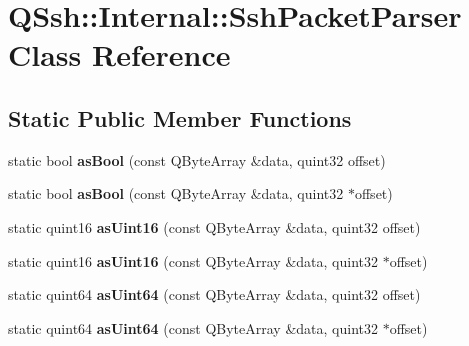 \hypertarget{class_q_ssh_1_1_internal_1_1_ssh_packet_parser}{}\section{Q\+Ssh\+:\+:Internal\+:\+:Ssh\+Packet\+Parser Class Reference}
\label{class_q_ssh_1_1_internal_1_1_ssh_packet_parser}
\subsection*{Static Public Member Functions}
\begin{DoxyCompactItemize}
\item 
\mbox{\label{class_q_ssh_1_1_internal_1_1_ssh_packet_parser_af5e0e18f77d7d73ffe9b0d741d625705}} 
static bool {\bfseries as\+Bool} (const Q\+Byte\+Array \&data, quint32 offset)
\item 
\mbox{\label{class_q_ssh_1_1_internal_1_1_ssh_packet_parser_a33a7b9a752fcb1911d0be93674a5538f}} 
static bool {\bfseries as\+Bool} (const Q\+Byte\+Array \&data, quint32 $\ast$offset)
\item 
\mbox{\label{class_q_ssh_1_1_internal_1_1_ssh_packet_parser_aca982ff66150a849bb536aadc66c184a}} 
static quint16 {\bfseries as\+Uint16} (const Q\+Byte\+Array \&data, quint32 offset)
\item 
\mbox{\label{class_q_ssh_1_1_internal_1_1_ssh_packet_parser_aacdb48f76c92c151c04eea5cfc13dd5f}} 
static quint16 {\bfseries as\+Uint16} (const Q\+Byte\+Array \&data, quint32 $\ast$offset)
\item 
\mbox{\label{class_q_ssh_1_1_internal_1_1_ssh_packet_parser_a676ad1a2d4b2d1f438e290ebbe03f342}} 
static quint64 {\bfseries as\+Uint64} (const Q\+Byte\+Array \&data, quint32 offset)
\item 
\mbox{\label{class_q_ssh_1_1_internal_1_1_ssh_packet_parser_a62fa390db15b4760594ba1d781da0fa0}} 
static quint64 {\bfseries as\+Uint64} (const Q\+Byte\+Array \&data, quint32 $\ast$offset)

\end{DoxyCompactItemize}
